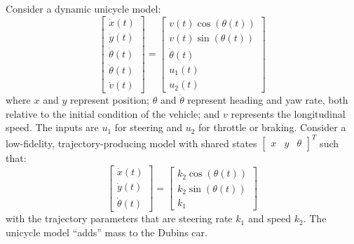 \begin{ex}
\label{ex:model}
Consider a dynamic unicycle model:
\begin{equation}
\begin{bmatrix} \dot{x}(t) \\ \dot{y}(t) \\ \dot{\theta}(t) \\ \ddot{\theta}(t) \\ \dot{v}(t) \end{bmatrix} = \begin{bmatrix} v(t)\cos\left(\theta(t)\right) \\ v(t)\sin\left(\theta(t)\right) \\ \dot{\theta}(t) \\ u_1(t) \\ u_2(t) \end{bmatrix}
\end{equation}	
where $x$ and $y$ represent position; $\theta$ and $\dot{\theta}$ represent heading and yaw rate, both relative to the initial condition of the vehicle; and $v$ represents the longitudinal speed. 
The inputs are $u_1$ for steering and $u_2$ for throttle or braking.
Consider a low-fidelity, trajectory-producing model with shared states $\begin{bmatrix} x & y & \theta \end{bmatrix}^T$ such that:
\begin{equation}\label{eq:dubins_dyn}
\begin{bmatrix} \dot{x}(t) \\ \dot{y}(t) \\ \dot{\theta}(t) \end{bmatrix} = \begin{bmatrix} k_2\cos\left(\theta(t)\right) \\ k_2\sin\left(\theta(t)\right) \\ k_1 \end{bmatrix}
\end{equation}
with the trajectory parameters that are steering rate $k_1$ and speed $k_2$.
The unicycle model ``adds'' mass to the Dubins car.
\end{ex}

